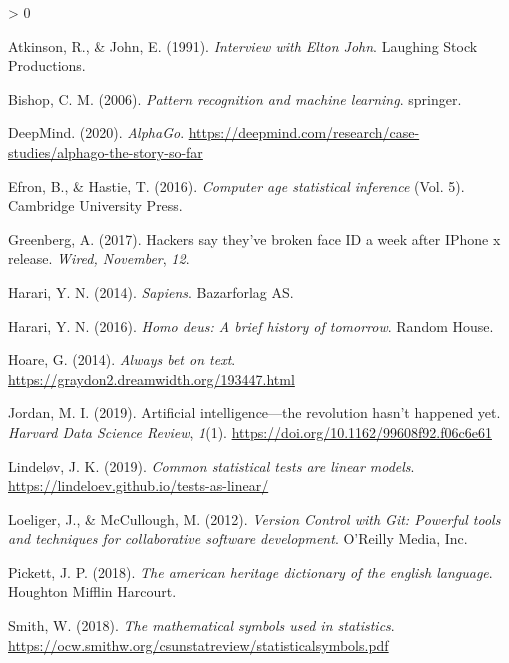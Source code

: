 \documentclass[
  14pt
  american,
  paper=a4,
  ,captions=tableheading
]{scrbook}
\newlength{\cslhangindent}
\newenvironment{CSLReferences}[2] %
 {%
  \setlength{\parindent}{0pt}
  \ifodd #1 \everypar{\setlength{\hangindent}{\cslhangindent}}\ignorespaces\fi
  \ifnum #2 > 0
  \setlength{\parskip}{#2\baselineskip}
  \fi
 }%
 {}
\begin{document}
\hypertarget{refs}{}
\begin{CSLReferences}{1}{0}
\leavevmode\hypertarget{ref-atkinson1991}{}%
Atkinson, R., \& John, E. (1991). \emph{{Interview with Elton John}}.
Laughing Stock Productions.

\leavevmode\hypertarget{ref-bishop2006pattern}{}%
Bishop, C. M. (2006). \emph{Pattern recognition and machine learning}.
springer.

\leavevmode\hypertarget{ref-deepmind2020alphago}{}%
DeepMind. (2020). \emph{AlphaGo}.
\url{https://deepmind.com/research/case-studies/alphago-the-story-so-far}

\leavevmode\hypertarget{ref-efron2016computer}{}%
Efron, B., \& Hastie, T. (2016). \emph{Computer age statistical
inference} (Vol. 5). Cambridge University Press.

\leavevmode\hypertarget{ref-greenberg2017hackers}{}%
Greenberg, A. (2017). Hackers say they've broken face ID a week after
IPhone x release. \emph{Wired, November}, \emph{12}.

\leavevmode\hypertarget{ref-harari2014sapiens}{}%
Harari, Y. N. (2014). \emph{Sapiens}. Bazarforlag AS.

\leavevmode\hypertarget{ref-harari2016homo}{}%
Harari, Y. N. (2016). \emph{Homo deus: A brief history of tomorrow}.
Random House.

\leavevmode\hypertarget{ref-hoare2014bet}{}%
Hoare, G. (2014). \emph{Always bet on text}.
\url{https://graydon2.dreamwidth.org/193447.html}

\leavevmode\hypertarget{ref-jordan2019artificial}{}%
Jordan, M. I. (2019). Artificial intelligence---the revolution hasn't
happened yet. \emph{Harvard Data Science Review}, \emph{1}(1).
\url{https://doi.org/10.1162/99608f92.f06c6e61}

\leavevmode\hypertarget{ref-lindelov2019common}{}%
Lindeløv, J. K. (2019). \emph{Common statistical tests are linear
models}. \url{https://lindeloev.github.io/tests-as-linear/}

\leavevmode\hypertarget{ref-loeliger2012version}{}%
Loeliger, J., \& McCullough, M. (2012). \emph{{Version Control with Git:
Powerful tools and techniques for collaborative software development}}.
O'Reilly Media, Inc.

\leavevmode\hypertarget{ref-pickett2018american}{}%
Pickett, J. P. (2018). \emph{The american heritage dictionary of the
english language}. Houghton Mifflin Harcourt.

\leavevmode\hypertarget{ref-smith2018mathematical}{}%
Smith, W. (2018). \emph{The mathematical symbols used in statistics}.
\url{https://ocw.smithw.org/csunstatreview/statisticalsymbols.pdf}


\end{CSLReferences}
\end{document}

